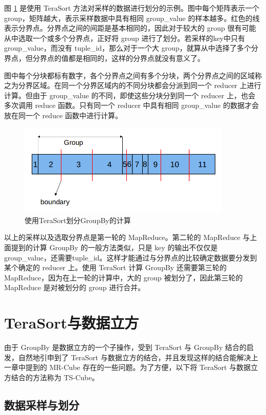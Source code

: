 图 \ref{ts_groupby} 是使用 TeraSort 方法对采样的数据进行划分的示例。图中每个矩阵表示一个 group，矩阵越大，表示采样数据中具有相同 group\_value 的样本越多。红色的线表示分界点。分界点之间的间距是基本相同的，因此对于较大的 group 很有可能从中选取一个或多个分界点，正好将 group 进行了划分。若采样的key中只有 group\_value，而没有 tuple\_id，那么对于一个大 group，就算从中选择了多个分界点，但分界点的值都是相同的，这样的分界点就没有意义了。

图中每个分块都标有数字，各个分界点之间有多个分块，两个分界点之间的区域称之为分界区域。在同一个分界区域内的不同分块都会分派到同一个 reducer 上进行计算。但由于 group\_value 的不同，即使这些分块分到同一个 reducer 上，也会多次调用 reduce 函数。只有同一个 reducer 中具有相同 group\_value 的数据才会放在同一个 reduce 函数中进行计算。

\begin{figure}[!ht] 
\centering\includegraphics[width=4in]{picture/ch_terasort_mr/ts_groupby} 
\caption{使用TeraSort划分GroupBy的计算}\label{ts_groupby} 
\end{figure}

以上的采样以及选取分界点是第一轮的 MapReduce。第二轮的 MapReduce 与上面提到的计算 GroupBy 的一般方法类似，只是 key 的输出不仅仅是 group\_value，还需要tuple\_id。这样才能通过与分界点的比较确定数据要分发到某个确定的 reducer 上。使用 TeraSort 计算 GroupBy 还需要第三轮的 MapReduce，因为在上一轮的计算中，大的 group 被划分了，因此第三轮的 MapReduce 是对被划分的 group 进行合并。

\section{TeraSort与数据立方}

由于 GroupBy 是数据立方的一个子操作，受到 TeraSort 与 GroupBy 结合的启发，自然地引申到了 TeraSort 与数据立方的结合，并且发现这样的结合能解决上一章中提到的 MR-Cube 存在的一些问题。为了方便，以下将 TeraSort 与数据立方结合的方法称为 TS-Cube。

\subsection{数据采样与划分}

